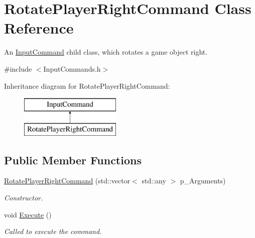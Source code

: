 \hypertarget{class_rotate_player_right_command}{}\section{Rotate\+Player\+Right\+Command Class Reference}
\label{class_rotate_player_right_command}


An \mbox{\hyperlink{class_input_command}{Input\+Command}} child class, which rotates a game object right.  




{\ttfamily \#include $<$Input\+Commands.\+h$>$}

Inheritance diagram for Rotate\+Player\+Right\+Command\+:\begin{figure}[H]
\begin{center}
\leavevmode
\includegraphics[height=2.000000cm]{class_rotate_player_right_command}
\end{center}
\end{figure}
\subsection*{Public Member Functions}
\begin{DoxyCompactItemize}
\item 
\mbox{\hyperlink{class_rotate_player_right_command_a039e4818400e092298cbc8eda45eae2e}{Rotate\+Player\+Right\+Command}} (std\+::vector$<$ std\+::any $>$ p\+\_\+\+Arguments)
\begin{DoxyCompactList}\small\item\em Constructor. \end{DoxyCompactList}\item 
\mbox{\label{class_rotate_player_right_command_a1b5007039f51b8c426dc20a2458ebc6e}} 
void \mbox{\hyperlink{class_rotate_player_right_command_a1b5007039f51b8c426dc20a2458ebc6e}{Execute}} ()
\begin{DoxyCompactList}\small\item\em Called to execute the command. \end{DoxyCompactList}\end{DoxyCompactItemize}
